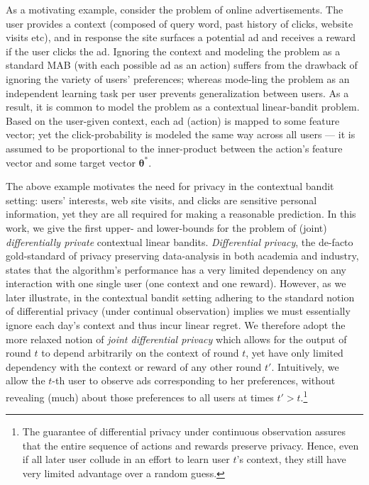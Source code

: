 \documentclass{article}
\renewcommand{\vec}[1]{\bm{#1}}
\begin{document}
As a motivating example, consider the problem of online
advertisements.  The user provides a context (composed of query word,
past history of clicks, website visits etc), and in response the site
surfaces a potential ad and receives a reward if the user clicks the
ad.  Ignoring the context and modeling the problem as a standard MAB
(with each possible ad as an action) suffers from the drawback of
ignoring the variety of users' preferences; whereas mode-ling the
problem as an independent learning task per user prevents
generalization between users.  As a result, it is common to model the problem as a
contextual linear-bandit problem.  Based on the user-given context,
each ad (action) is mapped to some feature vector; yet the
click-probability is modeled the same way across all users --- it is
assumed to be proportional to the inner-product between the action's
feature vector and some target vector $\vec\theta^*$.

The above example motivates the need for privacy in the contextual bandit setting: users' interests, web site visits, and clicks are
sensitive personal information, yet they are all required for making a reasonable prediction.
In this work, we give the first upper- and lower-bounds for the
problem of (joint) \emph{differentially private} contextual linear
bandits.
\emph{Differential privacy}, the de-facto gold-standard of
privacy preserving data-analysis in both academia and industry,
states that the algorithm's performance has a very limited dependency on any interaction with one single user (one context and one
reward).  However, as we later illustrate, in the contextual
bandit setting adhering to the standard notion of differential privacy (under continual observation) implies we must essentially ignore
each day's context and thus incur linear regret.  We therefore adopt
the more relaxed notion of \emph{joint differential privacy}
\citep{KearnsMechanismDesign2014} which allows for the output of round
$t$ to depend arbitrarily on the context of round $t$, yet have only
limited dependency with the context or reward of any other round
$t'$.  Intuitively, we allow the $t$-th user to observe ads
corresponding to her preferences, without revealing (much) about those
preferences to all users at times $t'>t$.\footnote{The guarantee of
  differential privacy under continuous observation assures that the
  entire sequence of actions and rewards preserve privacy.  Hence, even
  if all later user collude in an effort to learn user $t$'s context,
  they still have very limited advantage over a random guess.}
\end{document}
